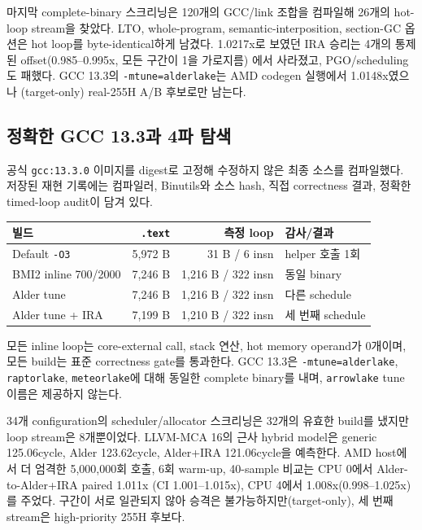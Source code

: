 \documentclass[11pt,a4paper]{article}
\begin{document}
마지막 complete-binary 스크리닝은 120개의 GCC/link 조합을 컴파일해 26개의
hot-loop stream을 찾았다.  LTO, whole-program, semantic-interposition,
section-GC 옵션은 hot loop를 byte-identical하게 남겼다.  1.0217x로 보였던
IRA 승리는 4개의 통제된 offset(0.985--0.995x, 모든 구간이 1을 가로지름)
에서 사라졌고, PGO/scheduling도 패했다.  GCC 13.3의
\texttt{-mtune=alderlake}는 AMD codegen 실행에서 1.0148x였으나
(target-only) real-255H A/B 후보로만 남는다.

\subsection{정확한 GCC 13.3과 4파 탐색}

공식 \texttt{gcc:13.3.0} 이미지를 digest로 고정해 수정하지 않은 최종
소스를 컴파일했다.  저장된 재현 기록에는 컴파일러, Binutils와 소스
hash, 직접 correctness 결과, 정확한 timed-loop audit이 담겨 있다.

\begin{center}
\small
\begin{tabular}{lrrl}
\toprule
빌드 & \texttt{.text} & 측정 loop & 감사/결과 \\
\midrule
Default \texttt{-O3} & 5,972 B & 31 B / 6 insn & helper 호출 1회 \\
BMI2 inline 700/2000 & 7,246 B & 1,216 B / 322 insn & 동일 binary \\
Alder tune & 7,246 B & 1,216 B / 322 insn & 다른 schedule \\
Alder tune + IRA & 7,199 B & 1,210 B / 322 insn & 세 번째 schedule \\
\bottomrule
\end{tabular}
\end{center}

모든 inline loop는 core-external call, stack 연산, hot memory operand가
0개이며, 모든 build는 표준 correctness gate를 통과한다.  GCC 13.3은
\texttt{-mtune=alderlake}, \texttt{raptorlake}, \texttt{meteorlake}에
대해 동일한 complete binary를 내며, \texttt{arrowlake} tune 이름은
제공하지 않는다.

34개 configuration의 scheduler/allocator 스크리닝은 32개의 유효한
build를 냈지만 loop stream은 8개뿐이었다.  LLVM-MCA 16의 근사 hybrid
model은 generic 125.06cycle, Alder 123.62cycle, Alder+IRA 121.06cycle을
예측한다.  AMD host에서 더 엄격한 5,000,000회 호출, 6회
warm-up, 40-sample 비교는 CPU 0에서 Alder-to-Alder+IRA paired 1.011x
(CI 1.001--1.015x), CPU 4에서 1.008x(0.998--1.025x)를 주었다.  구간이
서로 일관되지 않아 승격은 불가능하지만(target-only), 세
번째 stream은 high-priority 255H 후보다.
\end{document}
